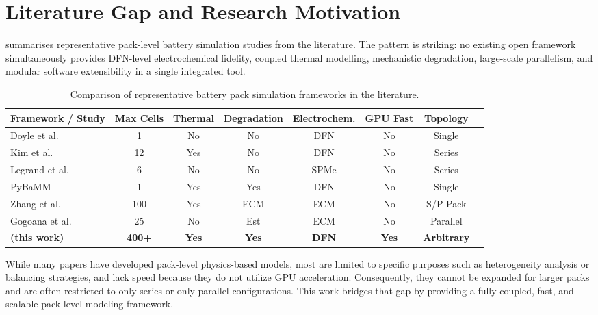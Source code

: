 \section{Literature Gap and Research Motivation}
\label{sec:literature_gap}

 summarises representative pack-level battery simulation studies from the literature. The pattern is striking: no existing open framework simultaneously provides DFN-level electrochemical fidelity, coupled thermal modelling, mechanistic degradation, large-scale parallelism, and modular software extensibility in a single integrated tool.

\begin{table}[H]
\centering
\caption{Comparison of representative battery pack simulation frameworks in the literature.}
\label{tab:pack_comparison}
\small
\begin{tabularx}{\textwidth}{p{3.0cm}ccccccc}
\toprule
\textbf{Framework / Study} & \textbf{Max Cells} & \textbf{Thermal} & \textbf{Degradation} & \textbf{Electrochem.} & \textbf{GPU Fast} & \textbf{Topology} \\
\midrule
Doyle et al.\ \cite{Doyle1993}      & 1   & No  & No  & DFN  & No  & Single \\
Kim et al.\ \cite{Kim2011}          & 12  & Yes & No  & DFN  & No  & Series \\
Legrand et al.\ \cite{Legrand2014}  & 6   & No  & No  & SPMe & No  & Series \\
PyBaMM \cite{Sulzer2021}            & 1   & Yes & Yes & DFN  & No  & Single \\
Zhang et al.\ \cite{Zhang2020}      & 100 & Yes & ECM & ECM  & No  & S/P Pack \\
Gogoana et al.\ \cite{Gogoana2014}  & 25  & No  & Est & ECM  & No  & Parallel \\
\textbf{\VIBE{} (this work)}        & \textbf{400+} & \textbf{Yes} & \textbf{Yes} & \textbf{DFN} & \textbf{Yes} & \textbf{Arbitrary} \\
\bottomrule
\end{tabularx}
\end{table}

While many papers have developed pack-level physics-based models, most are limited to specific purposes such as heterogeneity analysis or balancing strategies, and lack speed because they do not utilize GPU acceleration. Consequently, they cannot be expanded for larger packs and are often restricted to only series or only parallel configurations. This work bridges that gap by providing a fully coupled, fast, and scalable pack-level modeling framework.

